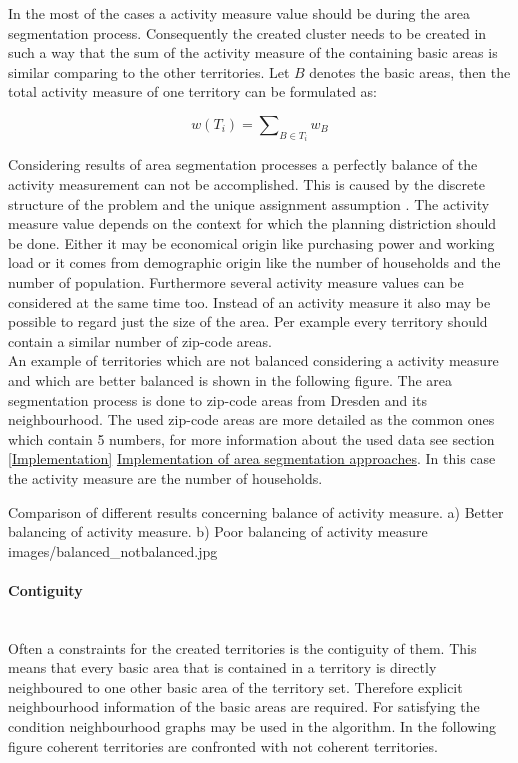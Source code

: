 In the most of the cases a activity measure value should be during the area segmentation process. Consequently the created cluster needs to be created in such a way that the sum of the activity measure of the containing basic areas is similar comparing to the other territories. Let $ B $ denotes the basic areas, then the total activity measure of one territory can be formulated as:

\[ \mathit{w(T_{i}) = \sum\nolimits  _{B \in T_{i}} w_{B}}\]

Considering results of area segmentation processes a perfectly balance of the activity measurement can not be accomplished. This is caused by the discrete structure of the problem and the unique assignment assumption \cite{kalcsics}. The activity measure value depends on the context for which the planning distriction should be done. Either it may be economical origin like purchasing power and working load or it comes from demographic origin like the number of households and the number of population. Furthermore several activity measure values can be considered at the same time too. Instead of an activity measure it also may be possible to regard just the size of the area. Per example every territory should contain a similar number of zip-code areas.\\
An example of territories which are not balanced considering a activity measure and which are better balanced is shown in the following figure. The area segmentation process is done to zip-code areas from Dresden and its neighbourhood. The used zip-code areas are more detailed as the common ones which contain 5 numbers, for more information about the used data see section \ref{Implementation} \hyperref[Implementation]{Implementation of area segmentation approaches}. In this case the activity measure are the number of households.

\begin{figureOwn}{Comparison of different results concerning balance of activity measure. a) Better balancing of activity measure. b) Poor balancing of activity measure }{images/balanced_notbalanced.jpg}\end{figureOwn}


\paragraph{Contiguity}\mbox{} \\

Often a constraints for the created territories is the contiguity of them. This means that every basic area that is contained in a territory is directly neighboured to one other basic area of the territory set. Therefore explicit neighbourhood information of the basic areas are required. For satisfying the condition neighbourhood graphs may be used in the algorithm. In the following figure coherent territories are confronted with not coherent territories.

